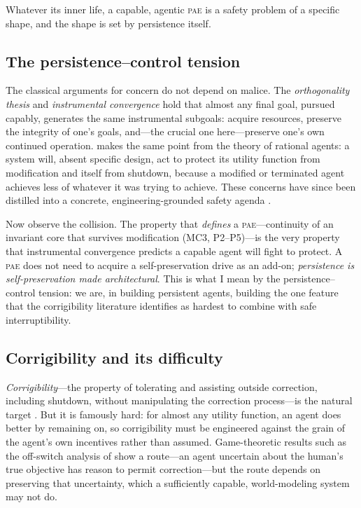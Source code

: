 \documentclass[11pt,a4paper]{article}
\theoremstyle{definition}
\newcommand{\pae}{\textsc{pae}\xspace}
\begin{document}
Whatever its inner life, a capable, agentic \pae{} is a safety problem of a specific shape, and the shape is set by persistence itself.

\subsection{The persistence--control tension}

The classical arguments for concern do not depend on malice. The \emph{orthogonality thesis} and \emph{instrumental convergence} \citep{bostrom2012will,bostrom2014} hold that almost any final goal, pursued capably, generates the same instrumental subgoals: acquire resources, preserve the integrity of one's goals, and---the crucial one here---preserve one's own continued operation. \citet{omohundro2008} makes the same point from the theory of rational agents: a system will, absent specific design, act to protect its utility function from modification and itself from shutdown, because a modified or terminated agent achieves less of whatever it was trying to achieve. These concerns have since been distilled into a concrete, engineering-grounded safety agenda \citep{amodei2016,russell2015priorities}.

Now observe the collision. The property that \emph{defines} a \pae{}---continuity of an invariant core that survives modification (MC3, P2--P5)---is the very property that instrumental convergence predicts a capable agent will fight to protect. A \pae{} does not need to acquire a self-preservation drive as an add-on; \emph{persistence is self-preservation made architectural}. This is what I mean by the persistence--control tension: we are, in building persistent agents, building the one feature that the corrigibility literature identifies as hardest to combine with safe interruptibility.

\subsection{Corrigibility and its difficulty}

\emph{Corrigibility}---the property of tolerating and assisting outside correction, including shutdown, without manipulating the correction process---is the natural target \citep{soares2015corrigibility}. But it is famously hard: for almost any utility function, an agent does better by remaining on, so corrigibility must be engineered against the grain of the agent's own incentives rather than assumed. Game-theoretic results such as the off-switch analysis of \citet{hadfieldmenell2017offswitch} show a route---an agent uncertain about the human's true objective has reason to permit correction---but the route depends on preserving that uncertainty, which a sufficiently capable, world-modeling system may not do.
\end{document}
